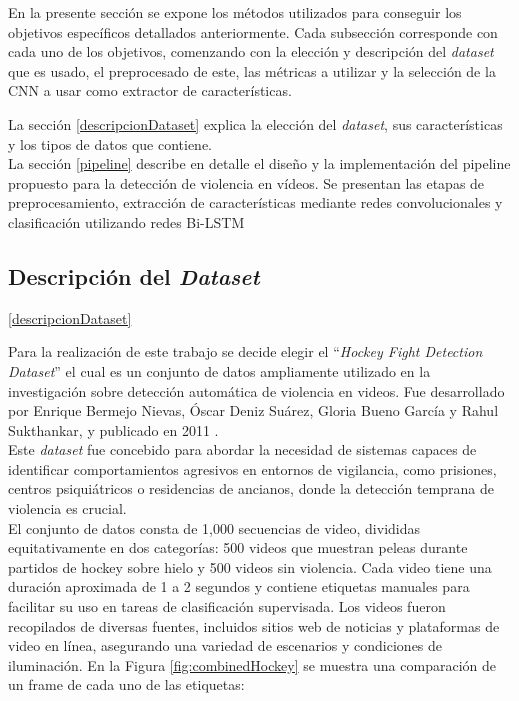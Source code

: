 En la presente sección se expone los métodos utilizados para 
conseguir los objetivos específicos detallados anteriormente. 
Cada subsección corresponde con cada uno de los objetivos, comenzando 
con la elección y descripción del \textit{dataset} que es usado,
el preprocesado de este, las métricas a utilizar y la selección de 
la CNN a usar como extractor de características.

La sección \ref{descripcionDataset} explica la elección del 
\textit{dataset}, sus características y los tipos de datos que 
contiene. \\

La sección \ref{pipeline} describe en detalle el diseño 
y la implementación del pipeline propuesto para la detección 
de violencia en vídeos. Se presentan las etapas de preprocesamiento, 
extracción de características mediante redes convolucionales y 
clasificación utilizando redes Bi-LSTM

\subsection{Descripción del \textit{Dataset}} \ref{descripcionDataset}

Para la realización de este trabajo se decide elegir el 
``\textit{Hockey Fight Detection Dataset}'' el cual es un 
conjunto de datos ampliamente utilizado en la investigación 
sobre detección automática de violencia en videos. Fue 
desarrollado por Enrique Bermejo Nievas, Óscar Deniz Suárez, 
Gloria Bueno García y Rahul Sukthankar, y publicado en 2011 
\cite{nievas2011violence}. \\

Este \textit{dataset} fue concebido para abordar la necesidad de 
sistemas capaces de identificar comportamientos agresivos en 
entornos de vigilancia, como prisiones, centros psiquiátricos 
o residencias de ancianos, donde la detección temprana de 
violencia es crucial.\\

El conjunto de datos consta de 1,000 secuencias de video, 
divididas equitativamente en dos categorías: 500 videos 
que muestran peleas durante partidos de hockey sobre hielo 
y 500 videos sin violencia. Cada video tiene una duración 
aproximada de 1 a 2 segundos y contiene etiquetas manuales 
para facilitar su uso en tareas de clasificación supervisada. 
Los videos fueron recopilados de diversas fuentes, incluidos 
sitios web de noticias y plataformas de video en línea, 
asegurando una variedad de escenarios y condiciones de 
iluminación. En la Figura \ref{fig:combinedHockey} se muestra 
una comparación de un frame de cada uno de las etiquetas: 

